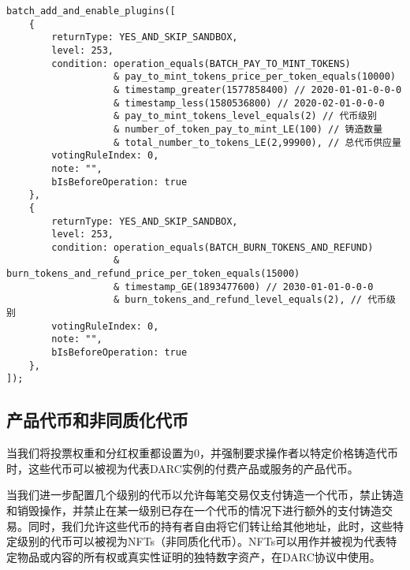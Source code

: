 \documentclass[main.tex]{subfiles}
\begin{document}
\begin{verbatim}
batch_add_and_enable_plugins([
    {
        returnType: YES_AND_SKIP_SANDBOX,
        level: 253, 
        condition: operation_equals(BATCH_PAY_TO_MINT_TOKENS)
                   & pay_to_mint_tokens_price_per_token_equals(10000)
                   & timestamp_greater(1577858400) // 2020-01-01-0-0-0
                   & timestamp_less(1580536800) // 2020-02-01-0-0-0
                   & pay_to_mint_tokens_level_equals(2) // 代币级别
                   & number_of_token_pay_to_mint_LE(100) // 铸造数量
                   & total_number_to_tokens_LE(2,99900), // 总代币供应量
        votingRuleIndex: 0, 
        note: "",
        bIsBeforeOperation: true  
    },
    {
        returnType: YES_AND_SKIP_SANDBOX,
        level: 253, 
        condition: operation_equals(BATCH_BURN_TOKENS_AND_REFUND)
                   & burn_tokens_and_refund_price_per_token_equals(15000)
                   & timestamp_GE(1893477600) // 2030-01-01-0-0-0
                   & burn_tokens_and_refund_level_equals(2), // 代币级别
        votingRuleIndex: 0, 
        note: "",
        bIsBeforeOperation: true  
    },
]);
\end{verbatim}

\subsection{产品代币和非同质化代币}

当我们将投票权重和分红权重都设置为0，并强制要求操作者以特定价格铸造代币时，这些代币可以被视为代表DARC实例的付费产品或服务的产品代币。

当我们进一步配置几个级别的代币以允许每笔交易仅支付铸造一个代币，禁止铸造和销毁操作，并禁止在某一级别已存在一个代币的情况下进行额外的支付铸造交易。同时，我们允许这些代币的持有者自由将它们转让给其他地址，此时，这些特定级别的代币可以被视为NFTs（非同质化代币）\cite{ethereumERC721NonFungible}。NFTs可以用作并被视为代表特定物品或内容的所有权或真实性证明的独特数字资产，在DARC协议中使用。
\end{document}

